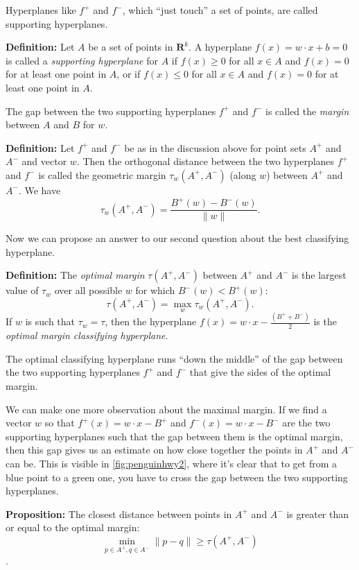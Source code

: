 \documentclass[
]{article}
\begin{document}
Hyperplanes like \(f^{+}\) and \(f^{-}\), which ``just touch'' a set of
points, are called supporting hyperplanes.

\textbf{Definition:} Let \(A\) be a set of points in \(\mathbf{R}^{k}\).
A hyperplane \(f(x)=w\cdot x+b=0\) is called a \emph{supporting
hyperplane} for \(A\) if \(f(x)\ge 0\) for all \(x\in A\) and \(f(x)=0\)
for at least one point in \(A\), or if \(f(x)\le 0\) for all \(x\in A\)
and \(f(x)=0\) for at least one point in \(A\).

The gap between the two supporting hyperplanes \(f^{+}\) and \(f^{-}\)
is called the \emph{margin} between \(A\) and \(B\) for \(w\).

\textbf{Definition:} Let \(f^{+}\) and \(f^{-}\) be as in the discussion
above for point sets \(A^{+}\) and \(A^{-}\) and vector \(w\). Then the
orthogonal distance between the two hyperplanes \(f^{+}\) and \(f^{-}\)
is called the geometric margin \(\tau_{w}(A^{+},A^{-})\) (along \(w\))
between \(A^{+}\) and \(A^{-}\). We have \[
\tau_{w}(A^{+},A^{-})=\frac{B^{+}(w)-B^{-}(w)}{\|w\|}.
\]

Now we can propose an answer to our second question about the best
classifying hyperplane.

\textbf{Definition:} The \emph{optimal margin} \(\tau(A^{+},A^{-})\)
between \(A^{+}\) and \(A^{-}\) is the largest value of \(\tau_{w}\)
over all possible \(w\) for which \(B^{-}(w)<B^{+}(w)\): \[
\tau(A^{+},A^{-}) = \max_{w} \tau_{w}(A^{+},A^{-}).
\] If \(w\) is such that \(\tau_{w}=\tau\), then the hyperplane
\(f(x)=w\cdot x - \frac{(B^{+}+B^{-})}{2}\) is the \emph{optimal margin
classifying hyperplane}.

The optimal classifying hyperplane runs ``down the middle'' of the gap
between the two supporting hyperplanes \(f^{+}\) and \(f^{-}\) that give
the sides of the optimal margin.

We can make one more observation about the maximal margin. If we find a
vector \(w\) so that \(f^{+}(x) = w\cdot x -B^{+}\) and
\(f^{-}(x) = w\cdot x-B^{-}\) are the two supporting hyperplanes such
that the gap between them is the optimal margin, then this gap gives us
an estimate on how close together the points in \(A^{+}\) and \(A^{-}\)
can be. This is visible in \cref{fig:penguinhwy2}, where it's clear that
to get from a blue point to a green one, you have to cross the gap
between the two supporting hyperplanes.

\textbf{Proposition:} The closest distance between points in \(A^{+}\)
and \(A^{-}\) is greater than or equal to the optimal margin: \[
\min_{p\in A^{+},q\in A^{-}} \|p-q\|\ge \tau(A^{+},A^{-})
\].
\end{document}
